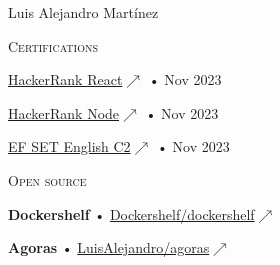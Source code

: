 \documentclass[12pt]{article}
\begin{document}
\begin{cv}{Luis Alejandro Mart\'inez}
\begin{minipage}[t]{0.35\textwidth}
    \vspace{0.25em}
    \begin{minipage}{\linewidth}
      \textrm{\textsc{\Large{Certifications}}}
      \newline
      \parbox[t]{\linewidth}{
        \href{https://www.hackerrank.com/certificates/bab8ecba39a0}{HackerRank React\footnotesize{$\nearrow$}} • Nov 2023\\
      }
      \parbox[t]{\linewidth}{
        \href{https://www.hackerrank.com/certificates/f6c3ad45aaa1}{HackerRank Node\footnotesize{$\nearrow$}} • Nov 2023\\
      }
      \parbox[t]{\linewidth}{
        \href{https://www.efset.org/cert/Nptkoz}{EF SET English C2\footnotesize{$\nearrow$}} • Nov 2023\\
      }
    \end{minipage}

    \vspace{0.25em}
    \begin{minipage}{\linewidth}
      \textrm{\textsc{\Large{Open source}}}
      \newline
      \parbox[t]{\linewidth}{
        \textbf{Dockershelf} • \href{https://github.com/Dockershelf/dockershelf}{Dockershelf/dockershelf\footnotesize{$\nearrow$}}\\
      }
      \parbox[t]{\linewidth}{
        \textbf{Agoras} • \href{https://github.com/LuisAlejandro/agoras}{LuisAlejandro/agoras\footnotesize{$\nearrow$}}\\
      }
    \end{minipage}
  
  \end{minipage}\hspace{0.5cm}
  \begin{minipage}[t]{0.55\textwidth}
    \vspace{0.125em}


\end{minipage}
\end{cv}
\end{document}
